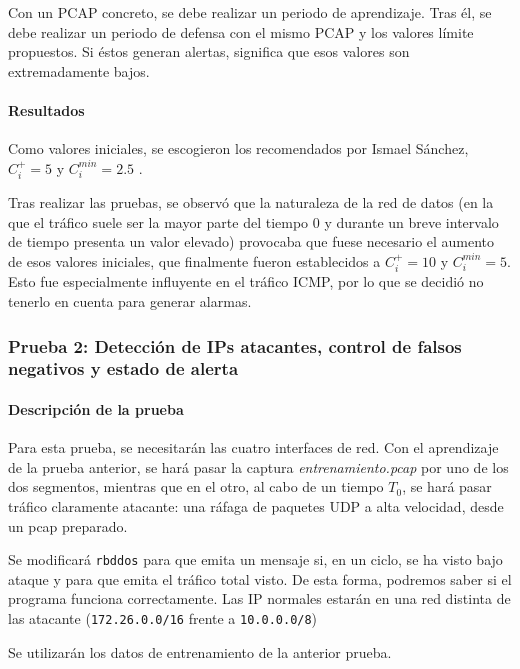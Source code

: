 Con un PCAP concreto, se debe realizar un periodo de aprendizaje. Tras él, se debe realizar un
periodo de defensa con el mismo PCAP y los valores límite propuestos. Si éstos generan alertas,
significa que esos valores son extremadamente bajos.

\paragraph{Resultados}\mbox{}

Como valores iniciales, se escogieron los recomendados por Ismael Sánchez, $C_i^+=5$ y $C_i^{min}=2.5$
 \cite{CUSUM_Carlos_III}.

Tras realizar las pruebas, se observó que la naturaleza de la red de datos (en la que el tráfico suele ser la 
mayor parte del tiempo $0$ y durante un breve intervalo de tiempo presenta un valor elevado) provocaba que fuese necesario
el aumento de esos valores iniciales, que finalmente fueron establecidos a $C_i^+=10$ y $C_i^{min}=5$. Esto fue
especialmente influyente en el tráfico \gls{ICMP}, por lo que se decidió no tenerlo en cuenta para generar alarmas.

\subsubsection{Prueba 2: Detección de IPs atacantes, control de falsos negativos y estado de 
alerta}
\paragraph{Descripción de la prueba}\mbox{}

Para esta prueba, se necesitarán las cuatro interfaces de red. Con el aprendizaje de la prueba anterior, se hará pasar 
la captura \emph{entrenamiento.pcap} por uno de los dos segmentos, mientras que en el otro, al cabo de un tiempo $T_0$, 
se hará pasar tráfico claramente atacante: una ráfaga de paquetes UDP a alta velocidad, desde un pcap preparado.

Se modificará \texttt{rbddos} para que emita un mensaje si, en un ciclo, se ha visto bajo ataque y para que emita el 
tráfico total visto. De esta forma, podremos saber si el programa funciona correctamente. Las IP normales estarán en 
una red distinta de las atacante (\texttt{172.26.0.0/16} frente a \texttt{10.0.0.0/8})

Se utilizarán los datos de entrenamiento de la anterior prueba.

\endinput

